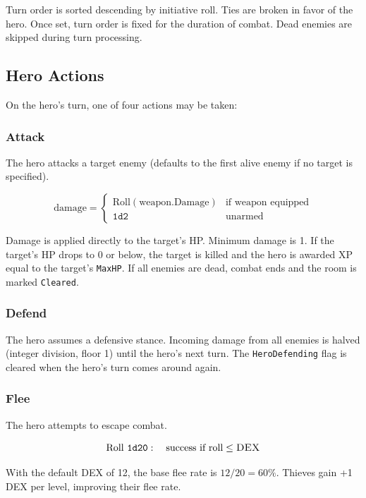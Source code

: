 \documentclass[a4paper,10pt]{article}
\newcommand{\dice}[1]{\texttt{#1}}
\newcommand{\stat}[1]{\textsc{#1}}
\newcommand{\field}[1]{\texttt{#1}}
\begin{document}
Turn order is sorted descending by initiative roll. Ties are broken in
favor of the hero. Once set, turn order is fixed for the duration of
combat. Dead enemies are skipped during turn processing.

\subsection{Hero Actions}

On the hero's turn, one of four actions may be taken:

\subsubsection{Attack}

The hero attacks a target enemy (defaults to the first alive enemy if no
target is specified).

\[
  \text{damage} = \begin{cases}
    \text{Roll}(\text{weapon.Damage}) & \text{if weapon equipped} \\
    \dice{1d2} & \text{unarmed}
  \end{cases}
\]

Damage is applied directly to the target's HP. Minimum damage is 1.
If the target's HP drops to 0 or below, the target is killed and the hero
is awarded XP equal to the target's \field{MaxHP}. If all enemies are dead,
combat ends and the room is marked \field{Cleared}.

\subsubsection{Defend}

The hero assumes a defensive stance. Incoming damage from all enemies is
halved (integer division, floor 1) until the hero's next turn. The
\field{HeroDefending} flag is cleared when the hero's turn comes around
again.

\subsubsection{Flee}

The hero attempts to escape combat.

\[
  \text{Roll } \dice{1d20}: \quad \text{success if roll} \leq \stat{DEX}
\]

With the default \stat{DEX} of 12, the base flee rate is $12/20 = 60\%$.
Thieves gain +1 \stat{DEX} per level, improving their flee rate.
\end{document}
